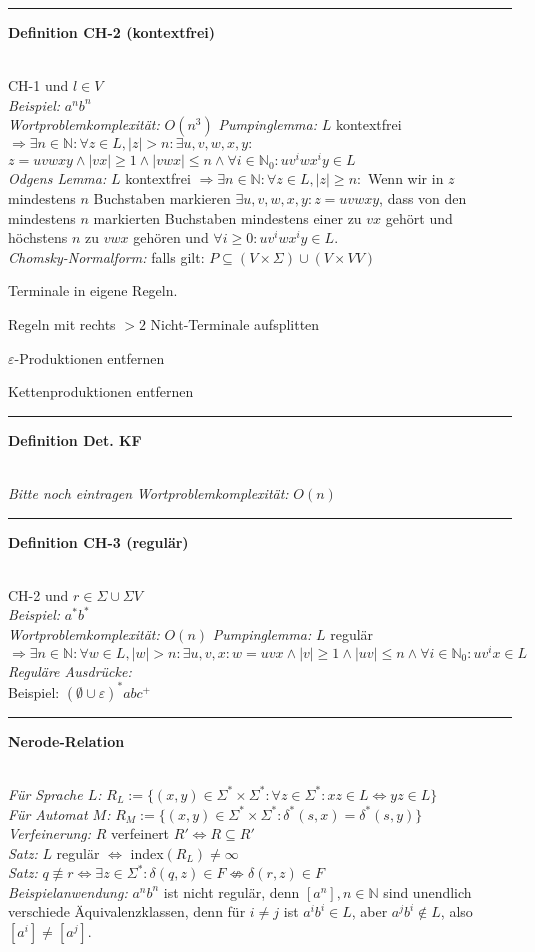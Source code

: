 \documentclass{article}
\newcommand{\hh}[1]{{\vspace{1pt}\hrule\vspace{1pt} \noindent\textbf{#1}}\\}
\newcommand{\hhh}[1]{{\vspace{1pt}\noindent\emph{#1:}}}
\newcounter{Lcount}
\newenvironment{tightenum}{
\begin{list}{\arabic{Lcount}.}{
\usecounter{Lcount}
\setlength{\topsep}{-1ex}
\setlength{\itemsep}{-1ex}
\setlength{\leftmargin}{4ex}}
}{
\end{list}
\vspace{1ex}
}
\newcommand{\FM}[1]{{\color{red}\emph{#1}}}
\begin{document}
\begin{multicols}{4}
\hh{Definition CH-2 (kontextfrei)}
CH-1 und $l\in V$\\
\hhh{Beispiel} $a^nb^n$\\
\hhh{Wortproblemkomplexität} $O(n^3)$
\hhh{Pumpinglemma}
$L$ kontextfrei $\Rightarrow\exists n\in\mathbb{N}:\forall z\in L, |z|> n: \exists u, v, w, x, y:$\\$z=uvwxy\wedge|vx|\ge 1\wedge|vwx|\le n \wedge \forall i\in \mathbb{N}_0:uv^iwx^iy\in L$\\
\hhh{Odgens Lemma} 
$L$ kontextfrei $\Rightarrow\exists n\in\mathbb{N}:\forall z\in L, |z|\ge n:$ Wenn wir in $z$ mindestens $n$ Buchstaben markieren $\exists u, v, w, x, y: z = uvwxy$, dass von den mindestens $n$ markierten Buchstaben mindestens einer zu $vx$ gehört und höchstens $n$ zu $vwx$ gehören und $\forall i \ge 0: uv^iwx^iy \in L$.\\
\hhh{Chomsky-Normalform}
falls gilt: $P\subseteq (V\times\Sigma)\cup( V\times VV)$
\begin{tightenum}
\item Terminale in eigene Regeln.
\item Regeln mit rechts $>2$ Nicht-Terminale aufsplitten
\item $\varepsilon$-Produktionen entfernen
\item Kettenproduktionen entfernen
\end{tightenum}

\hh{Definition Det. KF}
\FM{Bitte noch eintragen}
\hhh{Wortproblemkomplexität} $O(n)$

\hh{Definition CH-3 (regulär)}
CH-2 und $r\in\Sigma\cup\Sigma V$\\
\hhh{Beispiel} $a^*b^*$\\
\hhh{Wortproblemkomplexität} $O(n)$
\hhh{Pumpinglemma}
$L$ regulär $\Rightarrow\exists n\in\mathbb{N}:\forall w\in L,|w|> n: \exists u, v, x:w=uvx\wedge|v|\ge 1\wedge|uv|\le n\wedge\forall i\in\mathbb{N}_0:uv^ix\in L$\\
\hhh{Reguläre Ausdrücke}\\
Beispiel: $(\emptyset\cup\varepsilon)^*abc^+$\\

\hh{Nerode-Relation}
\hhh{Für Sprache $L$}
$R_L:=\{(x, y)\in \Sigma^*\times\Sigma^*:\forall z\in\Sigma^*:xz\in L\Leftrightarrow yz\in L\}$\\
\hhh{Für Automat $M$}
$R_M:=\{(x, y)\in \Sigma^*\times\Sigma^*:\delta^*(s,x) = \delta^*(s,y)\}$ \\
\hhh{Verfeinerung} $R$ verfeinert $R'\Leftrightarrow R\subseteq R'$\\
\hhh{Satz}
$L$ regulär $\Leftrightarrow$ index$(R_L)\ne\infty$\\
\hhh{Satz}
$q \not\equiv r\Leftrightarrow\exists z\in\Sigma^*:\delta(q, z)\in F\not\Leftrightarrow\delta(r, z)\in F$\\
\hhh{Beispielanwendung}
$a^nb^n$ ist nicht regulär, denn $[a^n],n\in\mathbb{N}$ sind unendlich verschiede Äquivalenzklassen, denn für $i\ne j$ ist $a^ib^i\in L$, aber $a^jb^i\notin L$, also $[a^i] \ne [a^j]$.


\end{multicols}
\end{document}
